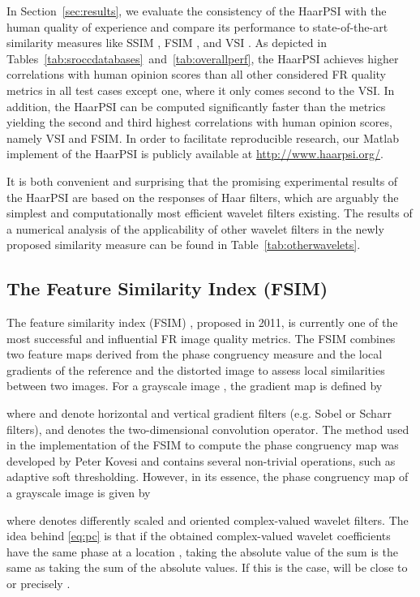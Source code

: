 \documentclass[11pt,a4paper]{article}
\begin{document}
In Section~\ref{sec:results}, we evaluate the consistency of the HaarPSI with the human
quality of experience and compare its performance to state-of-the-art similarity
measures like SSIM \cite{WBSS2004}, FSIM \cite{ZZMZ2011}, and VSI
\cite{ZSL2014}. As depicted in
Tables~\ref{tab:sroccdatabases}~and~\ref{tab:overallperf}, the HaarPSI achieves
higher correlations with human opinion scores than all other considered FR
quality metrics in all test cases except one, where it only comes second to the VSI.
In addition, the HaarPSI can be computed significantly faster than the metrics yielding the
second and third highest correlations with human opinion scores, namely VSI and
FSIM.    
In  order  to  facilitate reproducible research, our Matlab implement of the HaarPSI is publicly available
at \url{http://www.haarpsi.org/}.

It is both convenient and surprising that the promising experimental results of the HaarPSI are based on the responses of Haar filters,
which are arguably the simplest and computationally most efficient wavelet filters existing. The results of a numerical analysis of the applicability
of other wavelet filters in the newly proposed similarity measure can be found in Table~\ref{tab:otherwavelets}.  



\subsection{The Feature Similarity Index (FSIM)}
The feature similarity index (FSIM) \cite{ZZMZ2011}, proposed in 2011, is currently one of the most successful and influential FR image quality metrics. The FSIM combines two feature maps derived from the phase congruency measure \cite{Kov2000} and the local gradients of the reference and the distorted image to assess local similarities between two images. For a grayscale image , the gradient map is defined by  

where  and  denote horizontal and vertical gradient filters (e.g. Sobel or Scharr filters), and  denotes the two-dimensional convolution operator. The method used in the implementation of the FSIM to compute the phase congruency map was developed by Peter Kovesi \cite{KovONLINE} and contains several non-trivial operations, such as adaptive soft thresholding. However, in its essence, the phase congruency map of a grayscale image  is given by 


where  denotes differently scaled and oriented complex-valued wavelet filters. The idea behind \eqref{eq:pc} is that if the obtained complex-valued wavelet coefficients have the same phase at a location , taking the absolute value of the sum is the same as taking the sum of the absolute values. If this is the case,  will be close to or precisely . 
\end{document}
